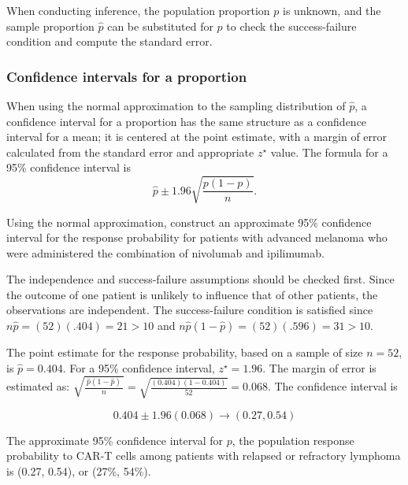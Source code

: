 When conducting inference, the population proportion $p$ is unknown, and the sample proportion $\hat{p}$ can be substituted for $p$ to check the success-failure condition and compute the standard error.

\subsubsection{Confidence intervals for a proportion}
\label{confIntForPropSection}


When using the normal approximation to the sampling distribution of $\hat{p}$, a confidence interval for a proportion has the same structure as a confidence interval for a mean; it is centered at the point estimate, with a margin of error calculated from the standard error and appropriate $z^{\star}$ value.  The formula for a 95\% confidence interval is
\[
     \hat{p} \pm 1.96 \sqrt{\frac{p(1-p)}{n}}.
\]


\begin{example}{Using the normal approximation, construct an approximate 95\% confidence interval for the response probability for patients with advanced melanoma who were administered the combination of nivolumab and ipilimumab.}

The independence and success-failure assumptions should be checked first.  Since the outcome of one patient is unlikely to influence that of other patients, the observations are independent.  The success-failure condition is satisfied since $n\hat{p} = (52)(.404) = 21  > 10$ and $n\hat{p}(1 - \hat{p}) = (52)(.596) = 31  > 10$.

The point estimate for the response probability, based on a sample of size $n = 52$, is $\hat{p} = 0.404$. For a 95\% confidence interval, $z^{\star} = 1.96$. The margin of error is estimated as: $\sqrt{\frac{\ \hat{p}(1-\hat{p})\ }{n}} = \sqrt{\frac{(0.404)(1-0.404)}{52}} = 0.068$.  The confidence interval is

\[0.404 \pm 1.96 (0.068) \rightarrow (0.27, 0.54) \]

The approximate 95\% confidence interval for $p$, the population response probability to CAR-T cells among patients with relapsed or refractory lymphoma is  (0.27, 0.54), or (27\%, 54\%).  

\end{example}

